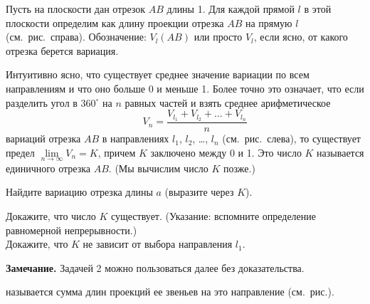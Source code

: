 \documentclass[10pt]{article}
\begin{document}


Пусть на плоскости дан отрезок $AB$ длины 1.
Для каждой прямой $l$ в этой плоскости
определим  как длину
проекции отрезка $AB$ на прямую $l$ (см.~рис.~справа).
Обозначение: $V_l(AB)$ или просто
$V_l$, если ясно, от какого отрезка берется вариация.

Интуитивно ясно, что существует среднее значение вариации по
всем 
направлениям
\noindent
и что оно больше 0 и меньше 1. Более
точно это означает, что если разделить угол в $360^\circ$
на $n$ равных частей и взять среднее
арифметическое
$$
\quad \quad V_n=\frac{V_{l_1}+V_{l_2}+\dots+V_{l_n}}{n}
$$
\vspace*{1mm}
\noindent
вариаций отрезка $AB$ в направлениях $l_1$, $l_2$, \dots, $l_n$
(см.~рис.~слева), то существует предел $\lim\limits_{n\rightarrow\infty}V_n=K$,
причем $K$ заключено между 0 и 1.
Это число $K$ называется  единичного
отрезка $AB$.
(Мы вычислим число $K$ позже.)


Найдите вариацию отрезка длины $a$ (выразите через $K$).


%



 Докажите, что число $K$ существует. (Указание: вспомните определение равномерной непрерывности.)\\
 Докажите, что $K$ не зависит от выбора направления $l_1$.

\noindent 
{\bf Замечание.} Задачей 2 можно пользоваться далее без доказательства.


 называется
сумма длин проекций ее звеньев на это направление (см.~рис.).
\end{document}

